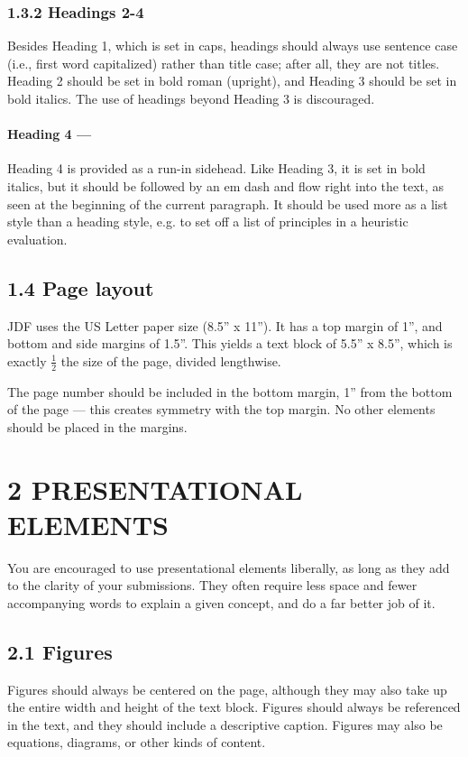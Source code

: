 {{{{\subsubsection*{1.3.2 Headings 2-4}
Besides Heading 1, which is set in caps, headings should always use sentence case (i.e., first word capitalized) rather than title case; after all, they are not titles. Heading 2 should be set in bold roman (upright), and Heading 3 should be set in bold italics. The use of headings beyond Heading 3 is discouraged.

\paragraph*{Heading 4 ---}
Heading 4 is provided as a run-in sidehead. Like Heading 3, it is set in bold italics, but it should be followed by an em dash and flow right into the text, as seen at the beginning of the current paragraph. It should be used more as a list style than a heading style, e.g. to set off a list of principles in a heuristic evaluation.

\subsection*{1.4 Page layout}
JDF uses the US Letter paper size (8.5'' x 11''). It has a top margin of 1'', and bottom and side margins of 1.5''. This yields a text block of 5.5'' x 8.5'', which is exactly $\frac{1}{2}$ the size of the page, divided lengthwise.

The page number should be included in the bottom margin, 1'' from the bottom of the page --- this creates symmetry with the top margin. No other elements should be placed in the margins.

\section*{2 PRESENTATIONAL ELEMENTS}
You are encouraged to use presentational elements liberally, as long as they add to the clarity of your submissions. They often require less space and fewer accompanying words to explain a given concept, and do a far better job of it.

\subsection*{2.1 Figures}
Figures should always be centered on the page, although they may also take up the entire width and height of the text block. Figures should always be referenced in the text, and they should include a descriptive caption. Figures may also be equations, diagrams, or other kinds of content.

}}}}
